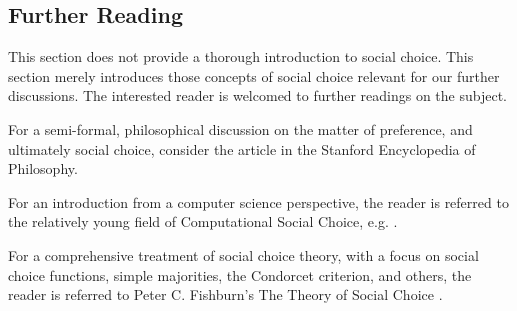 
%
% 
% 

\subsection{Further Reading}

This section does not provide a thorough introduction to social choice. This
section merely introduces those concepts of social choice relevant for our
further discussions. The interested reader is welcomed to further readings on
the subject.

For a semi-formal, philosophical discussion on the matter of preference, and
ultimately social choice, consider the article \cite{preferences} in the
Stanford Encyclopedia of Philosophy.

For an introduction from a computer science perspective, the reader is referred
to the relatively young field of Computational Social Choice, e.g.
\cite{brandt, chevaleyre}.

For a comprehensive treatment of social choice theory, with a focus on social
choice functions, simple majorities, the Condorcet criterion, and others, the
reader is referred to Peter C. Fishburn's The Theory of Social Choice
\cite{fishburn}.

